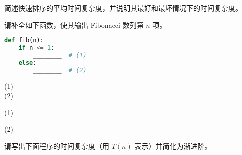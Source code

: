 \documentclass[12pt,answers]{zjutexam}
\begin{document}
\begin{questions}
\begin{parts}
  \end{parts}


\question

\question[10] 简述快速排序的平均时间复杂度，并说明其最好和最坏情况下的时间复杂度。

\vspace{3cm}

\question[15] 请补全如下函数，使其输出 Fibonacci 数列第 $n$ 项。

\begin{lstlisting}[language=Python]
def fib(n):
    if n <= 1:
        ________  # (1)
    else:
        ________  # (2)

\end{lstlisting}
(1)  \underline{\hspace{2.5cm}}  \\
(2)  \underline{\hspace{2.5cm}} 
\begin{solution}

(1) 

(2) 
\end{solution}
\vspace{3cm}

\question[20] 请写出下面程序的时间复杂度（用 $T(n)$ 表示）并简化为渐进阶。


\end{questions}
\end{document}
